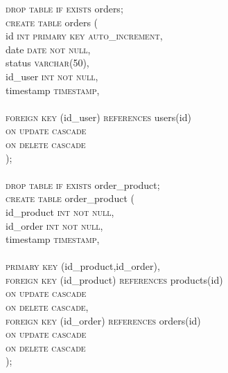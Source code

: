 \documentclass{article}
\begin{document}
\newpage

\textsc{\textcolor{sentence}{drop table if exists}} orders;\\
\textsc{\textcolor{sentence}{create table}} orders (\\
\phantom{abc} id \textsc{\textcolor{sentence}{int primary key auto\_increment}},\\
\phantom{abc} date \textsc{\textcolor{sentence}{date not null}},\\
\phantom{abc} status \textsc{\textcolor{sentence}{varchar\textcolor{numberSQL}{(50)}}},\\
\phantom{abc} id\_user \textsc{\textcolor{sentence}{int not null}},\\
\phantom{abc} timestamp \textsc{\textcolor{sentence}{timestamp}},\\\\
\phantom{abc} \textsc{\textcolor{sentence}{foreign key}} (id\_user) \textsc{\textcolor{sentence}{references}} users(id)\\
\phantom{abc} \textsc{\textcolor{sentence}{on update cascade}}\\
\phantom{abc} \textsc{\textcolor{sentence}{on delete  cascade}}\\
);\\\\
\textsc{\textcolor{sentence}{drop table if exists}} order\_product;\\
\textsc{\textcolor{sentence}{create table}} order\_product (\\
\phantom{abc} id\_product \textsc{\textcolor{sentence}{int not null}},\\
\phantom{abc} id\_order \textsc{\textcolor{sentence}{int not null}},\\
\phantom{abc} timestamp \textsc{\textcolor{sentence}{timestamp}},\\\\
\phantom{abc} \textsc{\textcolor{sentence}{primary key}} (id\_product,id\_order),\\
\phantom{abc} \textsc{\textcolor{sentence}{foreign key}} (id\_product) \textsc{\textcolor{sentence}{references}} products(id)\\
\phantom{abc} \textsc{\textcolor{sentence}{on update cascade}}\\
\phantom{abc} \textsc{\textcolor{sentence}{on delete  cascade}},\\
\phantom{abc} \textsc{\textcolor{sentence}{foreign key}} (id\_order) \textsc{\textcolor{sentence}{references}} orders(id)\\
\phantom{abc} \textsc{\textcolor{sentence}{on update cascade}}\\
\phantom{abc} \textsc{\textcolor{sentence}{on delete  cascade}}\\
);
\end{document}
